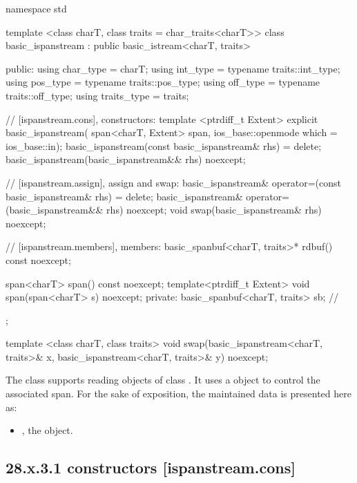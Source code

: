 \documentclass[ebook,11pt,article]{memoir}
\renewcommand{\iref}[1]{[#1]}
\begin{document}
\begin{codeblock}
namespace std {
  template <class charT, class traits = char_traits<charT>>
  class basic_ispanstream
    : public basic_istream<charT, traits> {
  public:
    using char_type      = charT;
    using int_type       = typename traits::int_type;
    using pos_type       = typename traits::pos_type;
    using off_type       = typename traits::off_type;
    using traits_type    = traits;

    // \iref{ispanstream.cons}, constructors:
    template <ptrdiff_t Extent>
    explicit basic_ispanstream(
      span<charT, Extent> span,
      ios_base::openmode which = ios_base::in);
    basic_ispanstream(const basic_ispanstream& rhs) = delete;
    basic_ispanstream(basic_ispanstream&& rhs) noexcept;

    // \iref{ispanstream.assign}, assign and swap:
    basic_ispanstream& operator=(const basic_ispanstream& rhs) = delete;
    basic_ispanstream& operator=(basic_ispanstream&& rhs) noexcept;
    void swap(basic_ispanstream& rhs) noexcept;

    // \iref{ispanstream.members}, members:
    basic_spanbuf<charT, traits>* rdbuf() const noexcept;

    span<charT> span() const noexcept;
	template<ptrdiff_t Extent>
    void span(span<charT> s) noexcept;
  private:
    basic_spanbuf<charT, traits> sb; // \expos
  };

  template <class charT, class traits>
    void swap(basic_ispanstream<charT, traits>& x,
              basic_ispanstream<charT, traits>& y) noexcept;
}
\end{codeblock}

\pnum
The class
supports reading objects of class
.
It uses a
object to control the associated span.
For the sake of exposition, the maintained data is presented here as:
\begin{itemize}
\item
{}, the  object.
\end{itemize}

\subsection{28.x.3.1  constructors [ispanstream.cons]}
\label{ispanstream.cons}
\end{document}
